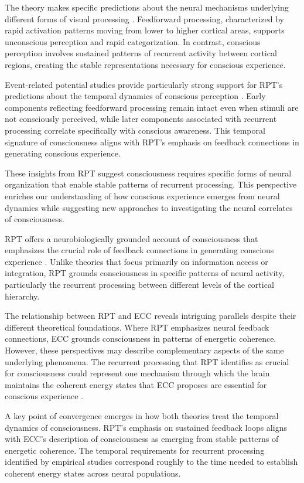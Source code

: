 The theory makes specific predictions about the neural mechanisms underlying different forms of visual processing \cite{Dehaene2006}. Feedforward processing, characterized by rapid activation patterns moving from lower to higher cortical areas, supports unconscious perception and rapid categorization. In contrast, conscious perception involves sustained patterns of recurrent activity between cortical regions, creating the stable representations necessary for conscious experience.

Event-related potential studies provide particularly strong support for RPT's predictions about the temporal dynamics of conscious perception \cite{Koivisto2010}. Early components reflecting feedforward processing remain intact even when stimuli are not consciously perceived, while later components associated with recurrent processing correlate specifically with conscious awareness. This temporal signature of consciousness aligns with RPT's emphasis on feedback connections in generating conscious experience.

These insights from RPT suggest consciousness requires specific forms of neural organization that enable stable patterns of recurrent processing. This perspective enriches our understanding of how conscious experience emerges from neural dynamics while suggesting new approaches to investigating the neural correlates of consciousness.

RPT offers a neurobiologically grounded account of consciousness that emphasizes the crucial role of feedback connections in generating conscious experience \cite{Lamme2006}. Unlike theories that focus primarily on information access or integration, RPT grounds consciousness in specific patterns of neural activity, particularly the recurrent processing between different levels of the cortical hierarchy.

The relationship between RPT and ECC reveals intriguing parallels despite their different theoretical foundations. Where RPT emphasizes neural feedback connections, ECC grounds consciousness in patterns of energetic coherence. However, these perspectives may describe complementary aspects of the same underlying phenomena. The recurrent processing that RPT identifies as crucial for consciousness could represent one mechanism through which the brain maintains the coherent energy states that ECC proposes are essential for conscious experience \cite{Lamme2006}.

A key point of convergence emerges in how both theories treat the temporal dynamics of consciousness. RPT's emphasis on sustained feedback loops aligns with ECC's description of consciousness as emerging from stable patterns of energetic coherence. The temporal requirements for recurrent processing identified by empirical studies \cite{Fahrenfort2007} correspond roughly to the time needed to establish coherent energy states across neural populations.

